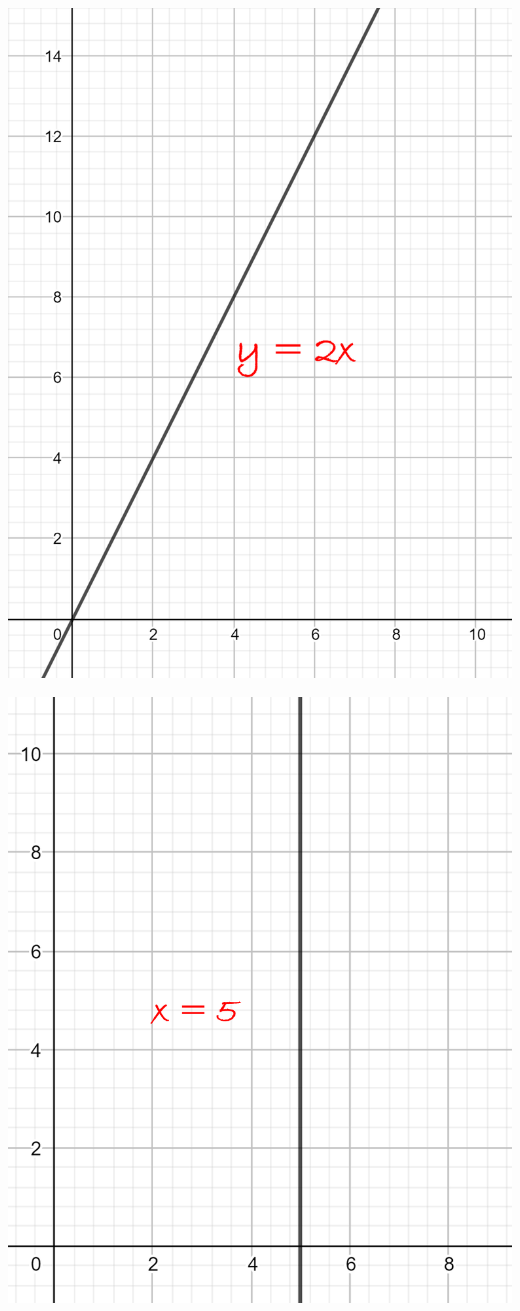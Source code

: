 \documentclass[12pt,a4paper]{article}
\begin{document}
\begin{multicols}{2}
	\begin{center}
		\includegraphics[scale=0.5]{img/lineaire}
	\end{center}


	\begin{center}
		\includegraphics[scale=0.5]{img/perp}
	\end{center}
\end{multicols}
\end{document}
